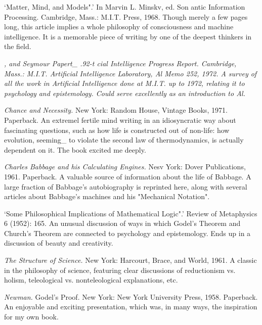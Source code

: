  `Matter, Mind, and Models".' In Marvin L. Minskv, ed. Son antic Information Processing. Cambridge, Mass.: M.I.T. Press, 1968. Though merely a few pages long, this article implies a whole philosophy of consciousness and machine intelligence. It is a memorable piece of writing by one of the deepest thinkers in the field.

 {\sl , and Seymour Papert\_ .92-t cial Intelligence Progress Report. Cambridge, Mass.: M.I.T. Artificial Intelligence Laboratory, Al Memo 252, 1972. A survey of all the work in Artificial Intelligence done at M.I.T. up to 1972, relating it to psychology and epistemology. Could serve excellently as an introduction to Al.} 

 {\sl Chance and Necessity.} New York: Random House, Vintage Books, 1971. Paperback. An extremel fertile mind writing in an idiosyncratic way about fascinating questions, such as how life is constructed out of non-life: how evolution, seeming\_ to violate the second law of thermodynamics, is actually dependent on it. The book excited me deeply.

 {\sl Charles Babbage and his Calculating Engines.} \llap{*\enspace}Nesv York: Dover Publications, 1961. Paperback. A valuable source of information about the life of Babbage. A large fraction of Babbage's autobiography is reprinted here, along with several articles about Babbage's machines and his "Mechanical Notation".

 `Some Philosophical Implications of Mathematical Logic".' Review of Metaphysics 6 (1952): 165. An unusual discussion of ways in which Godel's Theorem and Church's Theorem are connected to psychology and epistemology. Ends up in a discussion of beauty and creativity.

 {\sl The Structure of Science.} New York: Harcourt, Brace, and World, 1961. A classic in the philosophy of science, featuring clear discussions of reductionism vs. holism, teleological vs. nonteleological explanations, etc.

 {\sl Newman.} Godel's Proof. New York: New York University Press, 1958. Paperback. An enjoyable and exciting presentation, which was, in many ways, the inspiration for my own book.

